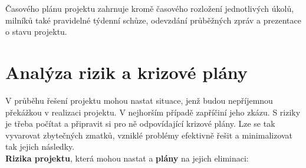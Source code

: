 \documentclass[12pt,a4paper]{article}
\begin{document}
Časového plánu projektu zahrnuje kromě časového rozložení jednotlivých úkolů, milníků také pravidelné týdenní schůze, odevzdání průběžných zpráv a prezentace o stavu projektu. 


\section*{Analýza rizik a krizové plány}
V průběhu řešení projektu mohou nastat situace, jenž budou nepříjemnou překážkou v realizaci projektu. V nejhorším případě zapříčiní jeho zkázu. S riziky je třeba počítat a připravit si pro ně odpovídající krizové plány. Lze se tak vyvarovat zbytečných zmatků, vzniklé problémy efektivně řešit a minimalizovat tak jejich následky. \\

\noindent \textbf{Rizika projektu}, která mohou nastat a \textbf{plány} na jejich eliminaci: 
\end{document}
